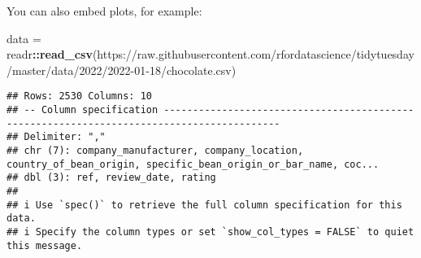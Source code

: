 \documentclass[
]{article}
\newenvironment{Shaded}{\begin{snugshade}}{\end{snugshade}}
\newcommand{\FunctionTok}[1]{\textcolor[rgb]{0.13,0.29,0.53}{\textbf{#1}}}
\newcommand{\NormalTok}[1]{#1}
\newcommand{\OtherTok}[1]{\textcolor[rgb]{0.56,0.35,0.01}{#1}}
\newcommand{\SpecialCharTok}[1]{\textcolor[rgb]{0.81,0.36,0.00}{\textbf{#1}}}
\newcommand{\StringTok}[1]{\textcolor[rgb]{0.31,0.60,0.02}{#1}}
\begin{document}
You can also embed plots, for example:

\begin{Shaded}
\begin{Highlighting}[]
\NormalTok{data }\OtherTok{=}\NormalTok{ readr}\SpecialCharTok{::}\FunctionTok{read\_csv}\NormalTok{(}\StringTok{\textquotesingle{}https://raw.githubusercontent.com/rfordatascience/tidytuesday/master/data/2022/2022{-}01{-}18/chocolate.csv\textquotesingle{}}\NormalTok{)}
\end{Highlighting}
\end{Shaded}

\begin{verbatim}
## Rows: 2530 Columns: 10
## -- Column specification ------------------------------------------------------------------------------------------
## Delimiter: ","
## chr (7): company_manufacturer, company_location, country_of_bean_origin, specific_bean_origin_or_bar_name, coc...
## dbl (3): ref, review_date, rating
## 
## i Use `spec()` to retrieve the full column specification for this data.
## i Specify the column types or set `show_col_types = FALSE` to quiet this message.
\end{verbatim}
\end{document}
